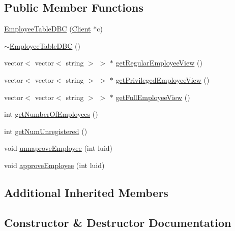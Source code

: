 \subsection*{Public Member Functions}
\begin{DoxyCompactItemize}
\item 
\hyperlink{class_employee_table_d_b_c_a1793bfecd277a6a7362ce32ade3627f7}{Employee\+Table\+D\+B\+C} (\hyperlink{class_client}{Client} $\ast$c)
\item 
\hyperlink{class_employee_table_d_b_c_a31fc9914701b35d63d9bf1961d855b94}{$\sim$\+Employee\+Table\+D\+B\+C} ()
\item 
vector$<$ vector$<$ string $>$ $>$ $\ast$ \hyperlink{class_employee_table_d_b_c_a7ca71072a7bbb5bbb0520259b3c3617c}{get\+Regular\+Employee\+View} ()
\item 
vector$<$ vector$<$ string $>$ $>$ $\ast$ \hyperlink{class_employee_table_d_b_c_a40d5fe0ac8a6906b08f3821ed2cd38b1}{get\+Privileged\+Employee\+View} ()
\item 
vector$<$ vector$<$ string $>$ $>$ $\ast$ \hyperlink{class_employee_table_d_b_c_ab2bd665f6fa18def52cbadd902937ebb}{get\+Full\+Employee\+View} ()
\item 
int \hyperlink{class_employee_table_d_b_c_af56bdf0ed6a8436b25e8a3029a8a4563}{get\+Number\+Of\+Employees} ()
\item 
int \hyperlink{class_employee_table_d_b_c_a416b470f5f4c69ba0534ed97e118fbc6}{get\+Num\+Unregistered} ()
\item 
void \hyperlink{class_employee_table_d_b_c_abce303a87d4e7ee1122684f749c5077a}{unnaprove\+Employee} (int luid)
\item 
void \hyperlink{class_employee_table_d_b_c_a6273aadca7c99759d9a6c8305c904d8b}{approve\+Employee} (int luid)
\end{DoxyCompactItemize}
\subsection*{Additional Inherited Members}


\subsection{Constructor \& Destructor Documentation}
\hypertarget{class_employee_table_d_b_c_a1793bfecd277a6a7362ce32ade3627f7}{}
